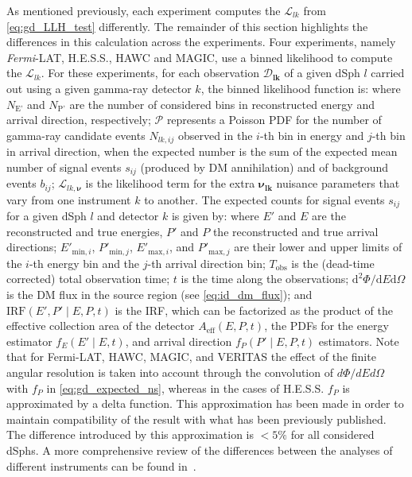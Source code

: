 As mentioned previously, each experiment computes the $\mathcal{L}_{lk}$ from \cref{eq:gd_LLH_test} differently.
The remainder of this section highlights the differences in this calculation across the experiments.
Four experiments, namely \textit{Fermi}-LAT, H.E.S.S., HAWC and MAGIC, use a binned likelihood to compute the $\mathcal{L}_{lk}$.
For these experiments, for each observation $\bm{\mathcal{D}_{lk}}$ of a given dSph $l$ carried out using a given gamma-ray detector $k$, the binned likelihood function is:
\gdJointLLH
where $N_{\text{E'}}$ and $N_{\text{P'}}$ are the number of considered bins in reconstructed energy and arrival direction, respectively; $\mathcal{P}$ represents a Poisson PDF for the number of gamma-ray candidate events $ N_{lk,ij} $ observed in the $i$-th bin in energy and $j$-th bin in arrival direction, when the expected number is the sum of the expected mean number of signal events $ s_{ij} $ (produced by DM annihilation) and of background events $ b_{ij} $; $ \mathcal{L}_{lk,\bm{\nu}} $ is the likelihood term for the extra $ \bm{\nu_{lk}} $ nuisance parameters that vary from one instrument $k$ to another.
The expected counts for signal events $s_{ij}$ for a given dSph $l$ and detector $k$ is given by:
\gdExpectedNS
where $ E' $ and $ E $ are the reconstructed and true energies, $ P' $ and $ P $ the reconstructed and true arrival directions; $ E'_{\text{min},i} $, $ P'_{\text{min},j} $, $ E'_{\text{max},i} $, and $ P'_{\text{max},j} $ are their lower and upper limits of the $ i $-th energy bin and the $ j $-th arrival direction bin; $ T_{\text{obs}} $ is the (dead-time corrected) total observation time; $ t $ is the time along the observations; $ \text{d}^{2}\Phi/\text{d}E\text{d}\Omega $ is the DM flux in the source region (see \cref{eq:id_dm_flux});
and $ \text{IRF} \left( E', P' \mid E, P, t \right) $ is the IRF, which can be factorized as the product of the effective collection area of the detector $ A_{\mathrm{eff}} (E, P, t) $, the PDFs for the energy estimator $ f_{E} (E' \mid E,t) $, and arrival direction $ f_{P} (P' \mid E,P,t) $ estimators.
Note that for Fermi-LAT, HAWC, MAGIC, and VERITAS the effect of the finite angular resolution is taken into account through the convolution of $d\Phi/dE d\Omega$ with $f_{P}$ in \cref{eq:gd_expected_ns}, whereas in the cases of H.E.S.S. $f_{P}$ is approximated by a delta function.
This approximation has been made in order to maintain compatibility of the result with what has been previously published.
The difference introduced by this approximation is $<5\%$ for all considered dSphs.
A more comprehensive review of the differences between the analyses of different instruments can be found in~\cite{2020Galax...8...25R}.

